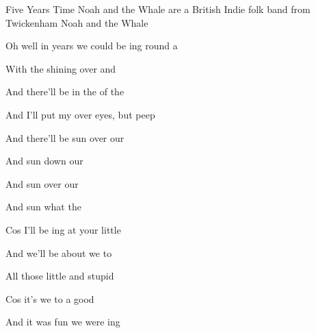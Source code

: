 \begin{SBSong}{Five Years Time}
  {Noah and the Whale are a British Indie folk band from Twickenham}
  {Noah and the Whale}
  \begin{SBVerse}
    Oh well in  years  we could be ing round a 
    
    With the  shining  over  and 
    
    And there'll be  in the  of the  
    
    And I'll put my  over  eyes, but  peep 
  \end{SBVerse}
  \begin{SBChorus}
    And there'll be  sun   over our 
    
    And  sun   down our 
    
    And  sun   over our 
    
    And  sun   what the 
  \end{SBChorus}
  \begin{SBVerse}
    Cos I'll be ing at  your  little 
    
    And we'll be  about  we  to 
    
    All those  little  and  stupid 
    
    Cos it's  we  to  a good 
  \end{SBVerse}
  \begin{SBChorus}
    And it was  fun   we were ing
    

\end{SBChorus}
\end{SBSong}
